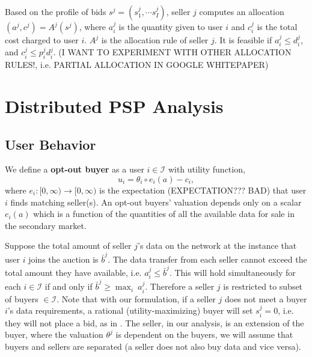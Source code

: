 \documentclass[12pt]{article}
\theoremstyle{definition}
\newcommand{\mcI}{\mathcal{I}}
\begin{document}
\begin{multicols}{2}
Based on the profile of bids $s^j = (s^j_1, \cdots s^j_I)$, seller $j$ computes
an allocation $(a^j, c^j) = A^j(s^j)$, where $a^j_i$ is the quantity given to
user $i$ and $c^j_i$ is the total cost charged to user $i$. $A^j$ is the
allocation rule of seller $j$. It is feasible if $a^j_i \le d_i^j$, and $c^j_i \le  p^j_i d_i^j$.
(I WANT TO EXPERIMENT WITH OTHER ALLOCATION RULES!, i.e. PARTIAL ALLOCATION IN
GOOGLE WHITEPAPER)

\section{Distributed PSP Analysis}
\subsection{User Behavior}

We define a \textbf{opt-out buyer} as a user $i\in\mcI$ with utility
function,
\begin{equation}\label{opt-utility}
    u_i = \theta_i \circ e_i(a) - c_i,
\end{equation}
where $e_i : [0, \infty) \rightarrow [0,\infty)$ is the expectation 
(EXPECTATION??? BAD) that user
$i$ finds matching seller(s). An opt-out buyers' valuation
depends only on a scalar $e_i(a)$ which is a function of the
quantities of all the available data for sale in the secondary market. 

Suppose the total amount of seller $j$'s data on the network at the instance that
user $i$ joins the auction is $\bar{b}^j$. 
The data transfer from each seller cannot exceed the total amount they have available,
i.e. $a_i^j \le \bar{b}^j$. This will hold simultaneously for each $i \in
\mcI$ if and only if $\bar{b}^j \ge \max_i \ a_i^j$. Therefore a seller $j$ is
restricted to subset of buyers $\in\mcI$.
Note that with our formulation, if a seller $j$ does not meet a buyer $i$'s data requirements, a
rational (utility-maximizing) buyer will set $s_i^j = 0$, i.e. they will not
place a bid, as in \cite{zheng}. The seller, in our analysis, is an extension of the buyer, where the valuation
$\theta^j$ is dependent on the buyers, we will assume that buyers and sellers
are separated (a seller does not also buy data and vice versa). 


\end{multicols}
\end{document}
